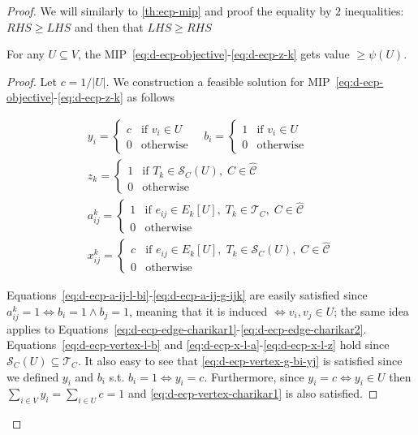 \begin{proof}
	We will similarly to \autoref{th:ecp-mip} and proof the equality by $2$
	inequalities: $RHS \geq LHS$ and then that $LHS \geq RHS$

	\begin{claim}
		For any $U \subseteq V$, the
		MIP~\ref{eq:d-ecp-objective}-\ref{eq:d-ecp-z-k} gets value $\geq \psi(U)$.
	\end{claim}

	\begin{proof}
		Let $c = 1 / |U|$. We construction a feasible solution for
		MIP~\ref{eq:d-ecp-objective}-\ref{eq:d-ecp-z-k} as follows

		\begin{gather}
			\label{eq:ecpp-y}
			y_i = \begin{cases}
				c & \text{if } v_{i} \in U \\
				0 & \text{otherwise}
			\end{cases} \quad
			b_i = \begin{cases}
				1 & \text{if } v_{i} \in U \\
				0 & \text{otherwise}
			\end{cases} \\
			\label{eq:ecpp-z}
			z_k = \begin{cases}
				1 & \text{if } T_{k} \in \mathcal{S}_C(U), \; C \in \mathcal{\hat{C}} \\
				0 & \text{otherwise}
			\end{cases} \\
			\label{eq:ecpp-x}
			a_{ij}^{k} = \begin{cases}
				1 & \text{if } e_{ij} \in E_{k}[U], \; T_{k} \in \mathcal{T} _C, \; C \in
				\mathcal{\hat{C}}                                                         \\
				0 & \text{otherwise}
			\end{cases} \\
			x_{ij}^{k} = \begin{cases}
				c & \text{if } e_{ij} \in E_{k}[U], \; T_{k} \in \mathcal{S}_C(U), \; C \in
				\mathcal{\hat{C}}                                                           \\
				0 & \text{otherwise}
			\end{cases}
		\end{gather}

		Equations~\ref{eq:d-ecp-a-ij-l-bi}-\ref{eq:d-ecp-a-ij-g-ijk} are easily
		satisfied since $a_{ij}^{k} = 1 \iff b_i = 1 \land b_j = 1$, meaning
		that it is induced $\iff v_i, v_j \in U$; the same idea applies to
		Equations~\ref{eq:d-ecp-edge-charikar1}-\ref{eq:d-ecp-edge-charikar2}.
		Equations~\ref{eq:d-ecp-vertex-l-b} and
		\ref{eq:d-ecp-x-l-a}-\ref{eq:d-ecp-x-l-z} hold since
		$\mathcal{S}_C(U) \subseteq \mathcal{T}_C $. It also easy to see that
		\autoref{eq:d-ecp-vertex-g-bi-yj} is satisfied since we defined $y_i$
		and $b_i$ s.t. $b_i = 1 \iff y_i = c$. Furthermore, since $y_i = c \iff
			y_i \in U$ then $ \sum^{}_{i \in V} y_i = \sum^{}_{i \in U} c = 1$
		and \autoref{eq:d-ecp-vertex-charikar1} is also satisfied.


\end{proof}
\end{proof}
